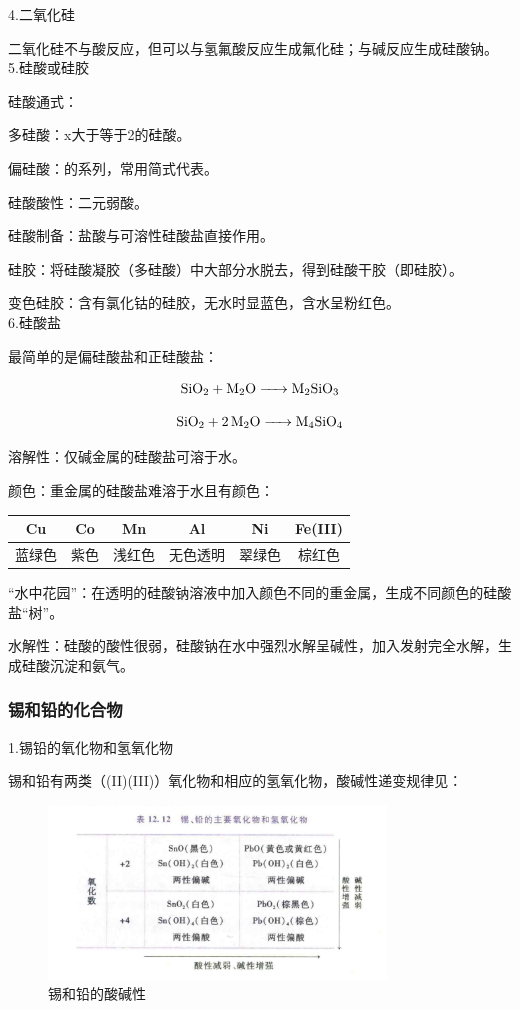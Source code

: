 \documentclass[a4paper,UTF8]{article}
\begin{document}
4.二氧化硅

二氧化硅不与酸反应，但可以与氢氟酸反应生成氟化硅；与碱反应生成硅酸钠。\\

5.硅酸或硅胶

硅酸通式：

多硅酸：x大于等于2的硅酸。

偏硅酸：的系列，常用简式代表。

硅酸酸性：二元弱酸。

硅酸制备：盐酸与可溶性硅酸盐直接作用。

硅胶：将硅酸凝胶（多硅酸）中大部分水脱去，得到硅酸干胶（即硅胶）。

变色硅胶：含有氯化钴的硅胶，无水时显蓝色，含水呈粉红色。\\

6.硅酸盐

最简单的是偏硅酸盐和正硅酸盐：

$$ \ce{SiO2 + M2O -> M2SiO3} $$

$$ \ce{SiO2 + 2M2O -> M4SiO4} $$

溶解性：仅碱金属的硅酸盐可溶于水。

颜色：重金属的硅酸盐难溶于水且有颜色：

\begin{tabular}{c|c|c|c|c|c}

	Cu&Co&Mn&Al&Ni&Fe(III)\\ \hline
	蓝绿色&紫色&浅红色&无色透明&翠绿色&棕红色\\

\end{tabular}

“水中花园”：在透明的硅酸钠溶液中加入颜色不同的重金属，生成不同颜色的硅酸盐“树”。

水解性：硅酸的酸性很弱，硅酸钠在水中强烈水解呈碱性，加入发射完全水解，生成硅酸沉淀和氨气。

\subsubsection{锡和铅的化合物}

1.锡铅的氧化物和氢氧化物

锡和铅有两类（(II)(III)）氧化物和相应的氢氧化物，酸碱性递变规律见：

\begin{figure}[htpb]
	\centering
	\includegraphics[width=0.8\textwidth]{figure//锡和铅的酸碱性.png}
	\caption{锡和铅的酸碱性}
	\label{fig:}
\end{figure}
\end{document}
